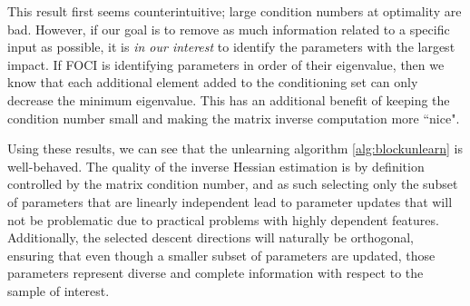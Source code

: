 This result first seems counterintuitive; large condition numbers at optimality are bad. However, if our goal is to remove as much information related to a specific input as possible, it is \textit{in our interest} to identify the parameters with the largest impact. If FOCI is identifying parameters in order of their eigenvalue, then we know that each additional element added to the conditioning set can only decrease the minimum eigenvalue.
This has an additional benefit of keeping the condition number small and making the matrix inverse computation more ``nice".

Using these results, we can see that the unlearning algorithm \ref{alg:blockunlearn} is well-behaved. The quality of the inverse Hessian estimation is by definition controlled by the matrix condition number, and as such selecting only the subset of parameters that are linearly independent lead to parameter updates that will not be problematic due to practical problems with highly dependent features. Additionally, the selected descent directions will naturally be orthogonal, ensuring that even though a smaller subset of parameters are updated, those parameters represent diverse and complete information with respect to the sample of interest. 